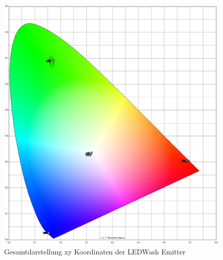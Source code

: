 \documentclass[11pt]{scrartcl}
\begin{document}
\begin{figure}[H]
    \begin{center}
        \includegraphics[width=\textwidth]{images/macAdam/led_wash_300Total.png}
    \end{center}
    \caption{Gesamtdarstellung xy Koordinaten der LEDWash Emitter}
\end{figure}
\end{document}
